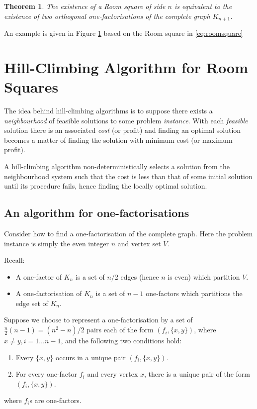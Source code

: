 \documentclass[11pt, a4paper]{book}\usepackage[]{graphicx}\usepackage[]{xcolor}
\newcounter{example}
\newtheorem{theorem}{Theorem}
\begin{document}
\begin{theorem}
The existence of a Room square of side $n$
is equivalent to the existence of two orthogonal
one-factorisations of the complete graph $K_{n+1}$.
\end{theorem}

An example is given in Figure
\ref{fig:orthogonal}
based on the Room square
in 
\eqref{eq:roomsquare}

\begin{figure}
\label{fig:orthogonal}
\end{figure}

\section{Hill-Climbing Algorithm for Room Squares}

The idea behind hill-climbing algorithms is to suppose
there exists a
\emph{neighbourhood}
of feasible solutions to
some problem
\emph{instance}.
With each
\emph{feasible}
solution
there is an associated
\emph{cost}
(or profit) and finding
an optimal solution becomes a matter of finding the solution
with minimum cost (or maximum profit).

A hill-climbing algorithm non-deterministically selects a
solution from the neighbourhood system such that the cost
is less than that of some initial solution until its
procedure fails, hence finding the locally optimal solution.

\subsection{An algorithm for one-factorisations}

Consider how to find a one-factorisation of the complete
graph. Here the problem instance is simply the even integer
$n$ and vertex set $V$.

Recall:
\begin{itemize}
  \item{A one-factor of $K_n$ is a set of $n/2$ edges (hence $n$ is even) which partition $V$.}
  \item{A one-factorisation of $K_n$ is a set of $n - 1$ one-factors which partitions the edge set of $K_n$.}
\end{itemize}

Suppose we choose to represent a one-factorisation by a set
of $\frac{n}{2}(n - 1) = (n^2 - n)/2$ pairs each of the form
$(f_i, \{x, y\})$, where $x \neq y, i = 1 \ldots n - 1$,
and the following two conditions hold:
\begin{enumerate}
  \item{Every $\{x, y\}$ occurs in a unique pair $(f_i, \{x, y\})$.}
  \item{For every one-factor $f_i$ and every vertex $x$, there is a unique pair of the form $(f_i, \{x, y\})$.}
\end{enumerate}
where $f_i$s are one-factors.
\end{document}
